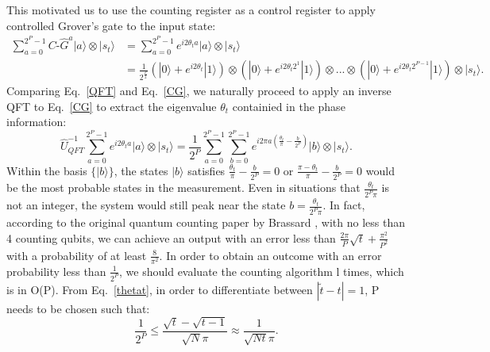 \documentclass[aps,prd,nofootinbib,twocolumn,reprint,superscriptaddress,showpacs,showkeys,longbibliography]{revtex4-1}
\newcommand{\ket}[1]{|#1\rangle}
\begin{document}
This motivated us to use the counting register as a control register to apply controlled Grover's gate to the input state:
\begin{equation}
\begin{split}
   \label{CG}
    \sum_{a=0}^{2^P-1}C\text{-}\hat{G}^a\ket{a}\otimes \ket{s_t}&=\sum_{a=0}^{2^P-1}e^{i2\theta_t a}\ket{a}\otimes\ket{s_t}\\
    &=\frac{1}{2^{\frac{P}{2}}}(\ket{0}+e^{i2\theta_t }\ket{1})\otimes(\ket{0}+e^{i2\theta_t2^1}\ket{1})\otimes...\otimes(\ket{0}+e^{i2\theta_t2^{P-1}}\ket{1})\otimes\ket{s_t}.
\end{split}
\end{equation}
Comparing Eq.~\ref{QFT} and Eq.~\ref{CG}, we naturally proceed to apply an inverse QFT to Eq.~\ref{CG} to extract the eigenvalue $\theta_t$ containied in the phase information:
\begin{equation}
   \label{InverQFT}
   \hat{U}^{-1}_{QFT}\sum_{a=0}^{2^P-1}e^{i2\theta_t a}\ket{a}\otimes\ket{s_t}=\frac{1}{2^{P}}\sum_{a=0}^{2^P-1} \sum_{b=0}^{2^P-1} e^{i2\pi a(\frac{\theta_t}{\pi}-\frac{b}{2^P})}\ket{b}\otimes\ket{s_t}.%
\end{equation}
Within the basis $\{\ket{b}\}$, the states $\ket{b}$ satisfies $\frac{\theta_t}{\pi}-\frac{b}{2^P}=0$ or $\frac{\pi -\theta_t}{\pi}-\frac{b}{2^P}=0$ would be the most probable states in the measurement. Even in situations that $\frac{\theta_t}{2^P\pi}$ is not an integer, the system would still peak near the state $b=\frac{\theta_t}{2^P\pi}$. In fact, according to the original quantum counting paper by Brassard \cite{brassard1998quantum}, with no less than 4 counting qubits, we can achieve an output with an error less than $\frac{2\pi}{P}\sqrt{t}+\frac{\pi^2}{P^2}$ with a probability of at least $\frac{8}{\pi^2}$. In order to obtain an outcome with an error probability less than $\frac{1}{2^P}$, %
we should evaluate the counting algorithm l times, which is in O(P). From Eq.~\ref{thetat}, in order to differentiate between $|\tilde{t}-t|=1$, P needs to be chosen such that:
\begin{equation}
    \label{P}
    \frac{1}{2^P}\leq \frac{\sqrt{t}-\sqrt{t-1}}{\sqrt{N}\pi}\approx \frac{1}{\sqrt{Nt}\pi}.
\end{equation}


\end{document}
